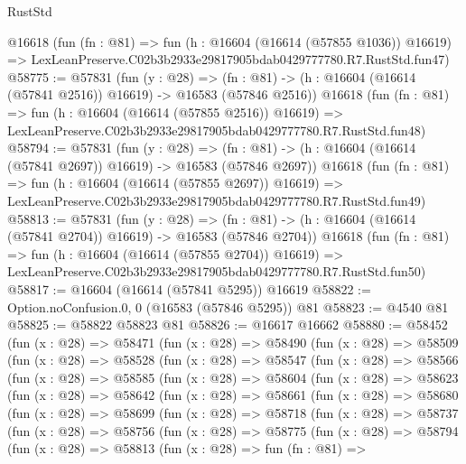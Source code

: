 \begin{lexlean}{RustStd}
\begin{coremodule}
    @16618
    (fun (fn : @81) =>
    fun (h : @16604 (@16614 (@57855 @1036)) @16619) =>
    LexLeanPreserve.C02b3b2933e29817905bdab0429777780.R7.RustStd.fun47)
@58775 := @57831
    (fun (y : @28) =>
    (fn : @81) -> (h : @16604 (@16614 (@57841 @2516)) @16619) -> @16583 (@57846 @2516))
    @16618
    (fun (fn : @81) =>
    fun (h : @16604 (@16614 (@57855 @2516)) @16619) =>
    LexLeanPreserve.C02b3b2933e29817905bdab0429777780.R7.RustStd.fun48)
@58794 := @57831
    (fun (y : @28) =>
    (fn : @81) -> (h : @16604 (@16614 (@57841 @2697)) @16619) -> @16583 (@57846 @2697))
    @16618
    (fun (fn : @81) =>
    fun (h : @16604 (@16614 (@57855 @2697)) @16619) =>
    LexLeanPreserve.C02b3b2933e29817905bdab0429777780.R7.RustStd.fun49)
@58813 := @57831
    (fun (y : @28) =>
    (fn : @81) -> (h : @16604 (@16614 (@57841 @2704)) @16619) -> @16583 (@57846 @2704))
    @16618
    (fun (fn : @81) =>
    fun (h : @16604 (@16614 (@57855 @2704)) @16619) =>
    LexLeanPreserve.C02b3b2933e29817905bdab0429777780.R7.RustStd.fun50)
@58817 := @16604 (@16614 (@57841 @5295)) @16619
@58822 := Option.noConfusion.{0, 0} (@16583 (@57846 @5295)) @81
@58823 := @4540 @81
@58825 := @58822 @58823 @81
@58826 := @16617 @16662
@58880 := @58452
    (fun (x : @28) =>
    @58471
      (fun (x : @28) =>
      @58490
        (fun (x : @28) =>
        @58509
          (fun (x : @28) =>
          @58528
            (fun (x : @28) =>
            @58547
              (fun (x : @28) =>
              @58566
                (fun (x : @28) =>
                @58585
                  (fun (x : @28) =>
                  @58604
                    (fun (x : @28) =>
                    @58623
                      (fun (x : @28) =>
                      @58642
                        (fun (x : @28) =>
                        @58661
                          (fun (x : @28) =>
                          @58680
                            (fun (x : @28) =>
                            @58699
                              (fun (x : @28) =>
                              @58718
                                (fun (x : @28) =>
                                @58737
                                  (fun (x : @28) =>
                                  @58756
                                    (fun (x : @28) =>
                                    @58775
                                      (fun (x : @28) =>
                                      @58794
                                        (fun (x : @28) =>
                                        @58813
                                          (fun (x : @28) =>
                                          fun (fn : @81) =>

\end{coremodule}
\end{lexlean}
